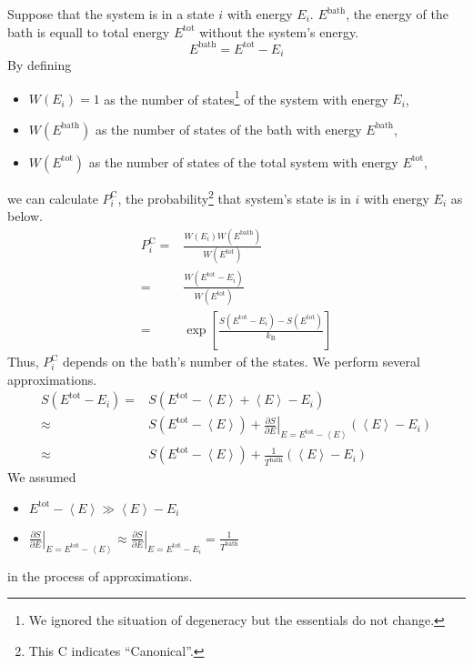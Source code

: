 \documentclass[a4paper,11pt]{article}
\begin{document}
Suppose that the system is in a state $i$ with energy $E_i$.
$E^\mathrm{bath}$, the energy of the bath is equall to
total energy $E^\mathrm{tot}$ without the system's energy.
\begin{equation*}
  E^\mathrm{bath}
  =
  E^\mathrm{tot}
  -
  E_i
\end{equation*}
By defining 
\begin{itemize}
  \item $W(E_i)=1$ as the number of states\footnote{We ignored the situation of degeneracy but the essentials do not change.} of the system with energy $E_i$, 
  \item $W(E^\mathrm{bath})$ as the number of states of the bath with energy $E^\mathrm{bath}$,
  \item $W(E^\mathrm{tot})$ as the number of states of the total system with energy $E^\mathrm{tot}$,
\end{itemize}
we can calculate $P^\mathrm{C}_i$, the probability\footnote
{
  This C indicates ``Canonical''.
} 
that system's state is in $i$ with energy $E_i$ as below.
\begin{align*}
  P^\mathrm{C}_i
  =&
  \frac{ W(E_i) W(E^\mathrm{bath}) }{ W(E^\mathrm{tot}) }
  \\=&
  \frac{ W(E^\mathrm{tot} - E_i) }{ W(E^\mathrm{tot}) }
  \\=&
  \exp 
  \left[
    \frac{S(E^\mathrm{tot} - E_i) - S(E^\mathrm{tot})}{k_\mathrm{B}} 
  \right]
\end{align*}
Thus, $P^\mathrm{C}_i$ depends on the bath's number of the states.
We perform several approximations.
\begin{align*}
  S(E^\mathrm{tot} - E_i)
  =&
  S(E^\mathrm{tot} - \left<E\right> + \left<E\right> - E_i)
  \\\approx&
  S(E^\mathrm{tot} - \left<E\right>)
  +
  \left.
  \frac{\partial S}{\partial E}
  \right|_{E = E^\mathrm{tot} - \left<E\right>}
  (\left<E\right> - E_i)
  \\\approx&
  S(E^\mathrm{tot} - \left<E\right>)
  +
  \frac{1}{T^\mathrm{bath}}
  (\left<E\right> - E_i)
\end{align*}
We assumed 
\begin{itemize}
  \item $E^\mathrm{tot} - \left<E\right> \gg \left<E\right> - E_i$ 
  \item
$
  \left.
  \frac{\partial S}{\partial E}
  \right|_{E = E^\mathrm{tot} - \left<E\right>}
  \approx
  \left.
  \frac{\partial S}{\partial E}
  \right|_{E = E^\mathrm{tot} - E_i}
  =
  \frac{1}{T^\mathrm{bath}}
$
\end{itemize}
in the process of approximations.
\end{document}
